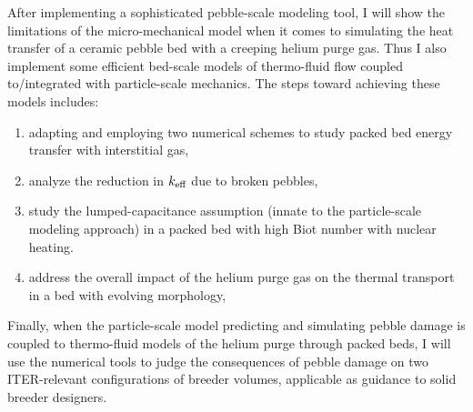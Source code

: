 After implementing a sophisticated pebble-scale modeling tool, I will show the limitations of the micro-mechanical model when it comes to simulating the heat transfer of a ceramic pebble bed with a creeping helium purge gas. Thus I also implement some efficient bed-scale models of thermo-fluid flow coupled to/integrated with particle-scale mechanics. The steps toward achieving these models includes:
\begin{enumerate}
	\item adapting and employing two numerical schemes to study packed bed energy transfer with interstitial gas,
	\item analyze the reduction in $k_\text{eff}$ due to broken pebbles,
	\item study the lumped-capacitance assumption (innate to the particle-scale modeling approach) in a packed bed with high Biot number with nuclear heating.
	\item address the overall impact of the helium purge gas on the thermal transport in a bed with evolving morphology,
\end{enumerate}

Finally, when the particle-scale model predicting and simulating pebble damage is coupled to thermo-fluid models of the helium purge through packed beds, I will use the numerical tools to judge the consequences of pebble damage on two ITER-relevant configurations of breeder volumes, applicable as guidance to solid breeder designers.




